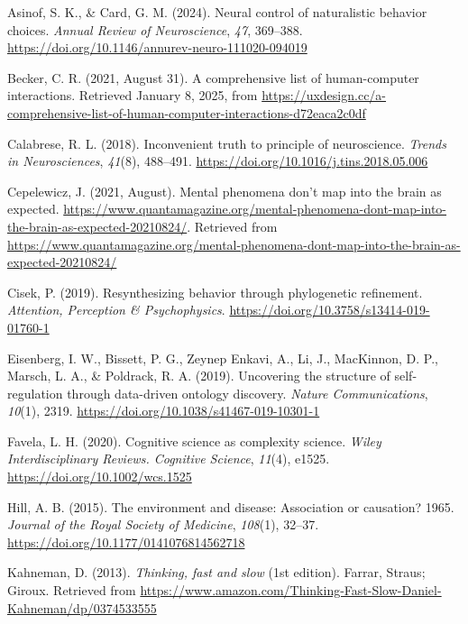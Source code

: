 \documentclass[
  letterpaper,
  DIV=11,
  numbers=noendperiod]{scrartcl}
\newlength{\cslhangindent}
\newenvironment{CSLReferences}[2] %
 {\begin{list}{}{%
  \setlength{\itemindent}{0pt}
  \setlength{\leftmargin}{0pt}
  \setlength{\parsep}{0pt}
  \ifodd #1
   \setlength{\leftmargin}{\cslhangindent}
   \setlength{\itemindent}{-1\cslhangindent}
  \fi
  \setlength{\itemsep}{#2\baselineskip}}}
 {\end{list}}
\begin{document}
\label{refs}
\begin{CSLReferences}{1}{0}
Asinof, S. K., \& Card, G. M. (2024). Neural control of naturalistic
behavior choices. \emph{Annual Review of Neuroscience}, \emph{47},
369--388. \url{https://doi.org/10.1146/annurev-neuro-111020-094019}

Becker, C. R. (2021, August 31). A comprehensive list of human-computer
interactions. Retrieved January 8, 2025, from
\url{https://uxdesign.cc/a-comprehensive-list-of-human-computer-interactions-d72eaca2c0df}

Calabrese, R. L. (2018). Inconvenient truth to principle of
neuroscience. \emph{Trends in Neurosciences}, \emph{41}(8), 488--491.
\url{https://doi.org/10.1016/j.tins.2018.05.006}

Cepelewicz, J. (2021, August). Mental phenomena don't map into the brain
as expected.
\url{https://www.quantamagazine.org/mental-phenomena-dont-map-into-the-brain-as-expected-20210824/}.
Retrieved from
\url{https://www.quantamagazine.org/mental-phenomena-dont-map-into-the-brain-as-expected-20210824/}

Cisek, P. (2019). Resynthesizing behavior through phylogenetic
refinement. \emph{Attention, Perception \& Psychophysics}.
\url{https://doi.org/10.3758/s13414-019-01760-1}

Eisenberg, I. W., Bissett, P. G., Zeynep Enkavi, A., Li, J., MacKinnon,
D. P., Marsch, L. A., \& Poldrack, R. A. (2019). Uncovering the
structure of self-regulation through data-driven ontology discovery.
\emph{Nature Communications}, \emph{10}(1), 2319.
\url{https://doi.org/10.1038/s41467-019-10301-1}

Favela, L. H. (2020). Cognitive science as complexity science.
\emph{Wiley Interdisciplinary Reviews. Cognitive Science}, \emph{11}(4),
e1525. \url{https://doi.org/10.1002/wcs.1525}

Hill, A. B. (2015). The environment and disease: Association or
causation? 1965. \emph{Journal of the Royal Society of Medicine},
\emph{108}(1), 32--37. \url{https://doi.org/10.1177/0141076814562718}

Kahneman, D. (2013). \emph{Thinking, fast and slow} (1st edition).
Farrar, Straus; Giroux. Retrieved from
\url{https://www.amazon.com/Thinking-Fast-Slow-Daniel-Kahneman/dp/0374533555}


\end{CSLReferences}
\end{document}
